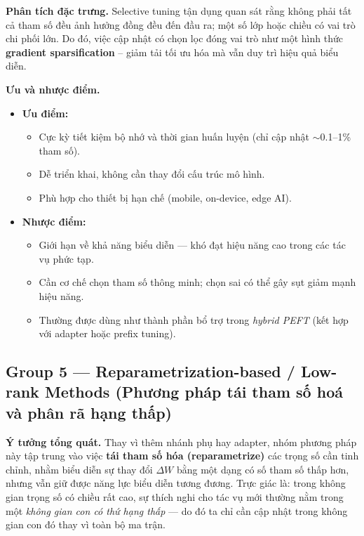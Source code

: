 \textbf{Phân tích đặc trưng.}  
Selective tuning tận dụng quan sát rằng không phải tất cả tham số đều ảnh hưởng đồng đều đến đầu ra; một số lớp hoặc chiều có vai trò chi phối lớn.  
Do đó, việc cập nhật có chọn lọc đóng vai trò như một hình thức \textbf{gradient sparsification} – giảm tải tối ưu hóa mà vẫn duy trì hiệu quả biểu diễn.

\textbf{Ưu và nhược điểm.}
\begin{itemize}
	\item \textbf{Ưu điểm:}
	\begin{itemize}
		\item Cực kỳ tiết kiệm bộ nhớ và thời gian huấn luyện (chỉ cập nhật $\sim$0.1–1\% tham số).  
		\item Dễ triển khai, không cần thay đổi cấu trúc mô hình.  
		\item Phù hợp cho thiết bị hạn chế (mobile, on-device, edge AI).  
	\end{itemize}
	\item \textbf{Nhược điểm:}
	\begin{itemize}
		\item Giới hạn về khả năng biểu diễn — khó đạt hiệu năng cao trong các tác vụ phức tạp.  
		\item Cần cơ chế chọn tham số thông minh; chọn sai có thể gây sụt giảm mạnh hiệu năng.  
		\item Thường được dùng như thành phần bổ trợ trong \textit{hybrid PEFT} (kết hợp với adapter hoặc prefix tuning).  
	\end{itemize}
\end{itemize}

\subsection{Group 5 — Reparametrization-based / Low-rank Methods (Phương pháp tái tham số hoá và phân rã hạng thấp)}
\label{ssec:reparam}

\textbf{Ý tưởng tổng quát.}  
Thay vì thêm nhánh phụ hay adapter, nhóm phương pháp này tập trung vào việc \textbf{tái tham số hóa (reparametrize)} các trọng số cần tinh chỉnh, nhằm biểu diễn sự thay đổi $\Delta W$ bằng một dạng có số tham số thấp hơn, nhưng vẫn giữ được năng lực biểu diễn tương đương.  
Trực giác là: trong không gian trọng số có chiều rất cao, sự thích nghi cho tác vụ mới thường nằm trong một \textit{không gian con có thứ hạng thấp} — do đó ta chỉ cần cập nhật trong không gian con đó thay vì toàn bộ ma trận.

